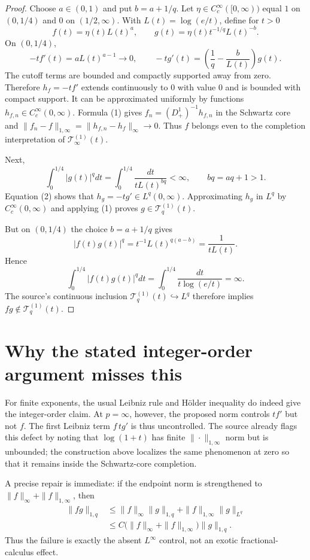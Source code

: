 \documentclass[11pt]{article}
\newcommand{\T}{\mathcal T}
\newcommand{\Dop}{D_+}
\begin{document}
\begin{proof}
Choose $a\in(0,1)$ and put $b=a+1/q$.  Let
$\eta\in C_c^\infty([0,\infty))$ equal $1$ on $(0,1/4)$ and $0$ on
$(1/2,\infty)$.  With $L(t)=\log(e/t)$, define for $t>0$
\[
 f(t)=\eta(t)L(t)^a,
 \qquad
 g(t)=\eta(t)t^{-1/q}L(t)^{-b}.
\]
On $(0,1/4)$,
\begin{equation}
 -t f'(t)=aL(t)^{a-1}\longrightarrow0,
 \qquad
 -t g'(t)=\left(\frac1q-\frac b{L(t)}\right)g(t). \tag{2}
\end{equation}
The cutoff terms are bounded and compactly supported away from zero.
Therefore $h_f=-tf'$ extends continuously to $0$ with value $0$ and is
bounded with compact support.  It can be approximated uniformly by functions
$h_{f,n}\in C_c^\infty(0,\infty)$.  Formula (1) gives
$f_n=(\Dop^1)^{-1}h_{f,n}$ in the Schwartz core and
$\|f_n-f\|_{1,\infty}=\|h_{f,n}-h_f\|_\infty\to0$.  Thus $f$ belongs even
to the completion interpretation of $\T_\infty^{(1)}(t)$.

Next,
\[
 \int_0^{1/4}|g(t)|^qdt
 =\int_0^{1/4}\frac{dt}{tL(t)^{bq}}<\infty,
 \qquad bq=aq+1>1.
\]
Equation (2) shows that $h_g=-tg'\in L^q(0,\infty)$.  Approximating $h_g$
in $L^q$ by $C_c^\infty(0,\infty)$ and applying (1) proves
$g\in\T_q^{(1)}(t)$.

But on $(0,1/4)$ the choice $b=a+1/q$ gives
\[
 |f(t)g(t)|^q
 =t^{-1}L(t)^{q(a-b)}
 =\frac1{tL(t)}.
\]
Hence
\[
 \int_0^{1/4}|f(t)g(t)|^qdt
 =\int_0^{1/4}\frac{dt}{t\log(e/t)}=\infty.
\]
The source's continuous inclusion $\T_q^{(1)}(t)\hookrightarrow L^q$
therefore implies $fg\notin\T_q^{(1)}(t)$.
\end{proof}

\section*{Why the stated integer-order argument misses this}

For finite exponents, the usual Leibniz rule and H\"older inequality do
indeed give the integer-order claim.  At $p=\infty$, however, the proposed
norm controls $tf'$ but not $f$.  The first Leibniz term $f\,tg'$ is thus
uncontrolled.  The source already flags this defect by noting that
$\log(1+t)$ has finite $\|\cdot\|_{1,\infty}$ norm but is unbounded; the
construction above localizes the same phenomenon at zero so that it remains
inside the Schwartz-core completion.

A precise repair is immediate: if the endpoint norm is strengthened to
$\|f\|_\infty+\|f\|_{1,\infty}$, then
\begin{align*}
 \|fg\|_{1,q}
 &\le \|f\|_\infty\|g\|_{1,q}
      +\|f\|_{1,\infty}\|g\|_{L^q}\\
 &\le C\bigl(\|f\|_\infty+\|f\|_{1,\infty}\bigr)\|g\|_{1,q}.
\end{align*}
Thus the failure is exactly the absent $L^\infty$ control, not an exotic
fractional-calculus effect.
\end{document}
